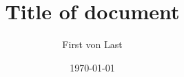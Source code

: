 


\author{First von Last}
\title{Title of document}
\date{\today}



\maketitle

\tableofcontents







